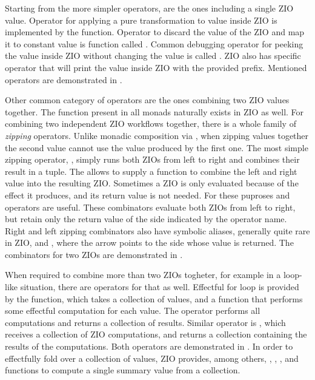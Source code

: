 

Starting from the more simpler operators, are the ones including a single ZIO value. Operator for applying a pure transformation to value inside ZIO is implemented by the  function. Operator to discard the value of the ZIO and map it to constant value is function called . Common debugging operator for peeking the value inside ZIO without changing the value is called . ZIO also has specific  operator that will print the value inside ZIO with the provided prefix. Mentioned operators are demonstrated in .



Other common category of operators are the ones combining two ZIO values together. The  function present in all monads naturally exists in ZIO as well.
For combining two independent ZIO workflows together, there is a whole family of \textit{zipping} operators. Unlike monadic composition via , when zipping values together the second value cannot use the value produced by the first one. The most simple zipping operator, , simply runs both ZIOs from left to right and combines their result in a tuple. The  allows to supply a function to combine the left and right value into the resulting ZIO. Sometimes a ZIO is only evaluated because of the effect it produces, and its return value is not needed. For these puproses  and  operators are useful. These combinators evaluate both ZIOs from left to right, but retain only the return value of the side indicated by the operator name. Right and left zipping combinators also have symbolic aliases, generally quite rare in ZIO, \inlinecode{*>} and \inlinecode{<*}, where the arrow points to the side whose value is returned. The combinators for two ZIOs are demonstrated in .



When required to combine more than two ZIOs togheter, for example in a loop-like situation, there are operators for that as well. Effectful for loop is provided by the  function, which takes a collection of values, and a function that performs some effectful computation for each value. The operator performs all computations and returns a collection of results. Similar operator is , which receives a collection of ZIO computations, and returns a collection containing the results of the computations. Both operators are demonstrated in . In order to effectfully fold over a collection of values, ZIO provides, among others, , , , and   functions to compute a single summary value from a collection.

